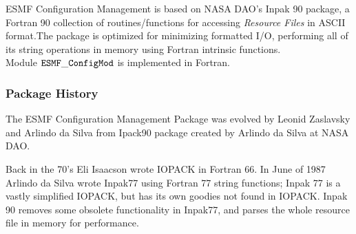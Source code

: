 

      ESMF Configuration Management is based on NASA DAO's 
      Inpak 90 package, a Fortran 90 collection of routines/functions
      for accessing {\em Resource Files} in ASCII format.The package 
      is optimized for minimizing formatted I/O, performing all of its 
      string operations in memory using Fortran intrinsic functions.\\

      Module ${\tt ESMF\_ConfigMod}$ is implemented in Fortran.

    \subsubsection{Package History}
       The ESMF Configuration Management Package was evolved by
       Leonid Zaslavsky and Arlindo da Silva from Ipack90 package
       created by Arlindo da Silva at NASA DAO.

       Back in the 70's Eli Isaacson wrote IOPACK in Fortran
       66.  In June of 1987 Arlindo da Silva wrote Inpak77 using
       Fortran 77 string functions; Inpak 77 is a vastly
       simplified IOPACK, but has its own goodies not found in
       IOPACK.  Inpak 90 removes some obsolete functionality in
       Inpak77, and parses the whole resource file in memory for
       performance.

